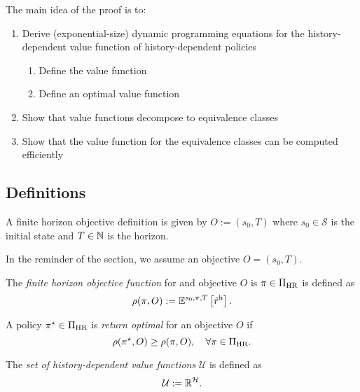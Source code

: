 The main idea of the proof is to:
\begin{enumerate}
\item Derive (exponential-size) dynamic programming equations for the history-dependent value function of history-dependent policies
  \begin{enumerate}
    \item Define the value function
    \item Define an optimal value function
  \end{enumerate}
\item Show that value functions decompose to equivalence classes
\item Show that the value function for the equivalence classes can be computed efficiently
\end{enumerate}

\subsection{Definitions}

\begin{definition} \label{def:ObjectiveFH}
  A finite horizon objective definition is given by $O := (s_0, T)$ where $s_0\in \mathcal{S}$ is the initial state and $T\in \mathbb{N}$ is the horizon.
\end{definition}

In the reminder of the section, we assume an objective $O = (s_0, T)$.
\begin{definition} \label{sec:objective-fh}
  The \emph{finite horizon objective function} for and objective $O$ is $\pi\in \Pi_{\mathrm{HR}}$ is defined as
  \[
    \rho(\pi, O)
    :=
    \mathbb{E}^{s_0, \pi, T} \left[\tilde{r}^{\mathrm{h}} \right].
  \]
\end{definition}

\begin{definition}\label{def:optimal-fh}
  A policy $\pi^{\star}\in \Pi_{\mathrm{HR}}$ is \emph{return optimal} for an objective $O$ if
  \[
   \rho(\pi^{\star}, O) \ge \rho(\pi, O), \quad \forall \pi \in \Pi_{\mathrm{HR}}.
 \]
\end{definition}

\begin{definition} \label{def:values-h}
  The \emph{set of history-dependent value functions} $\mathcal{U}$ is defined as
  \[
   \mathcal{U} := \mathbb{R}^{\mathcal{H}}.
 \]
\end{definition}

